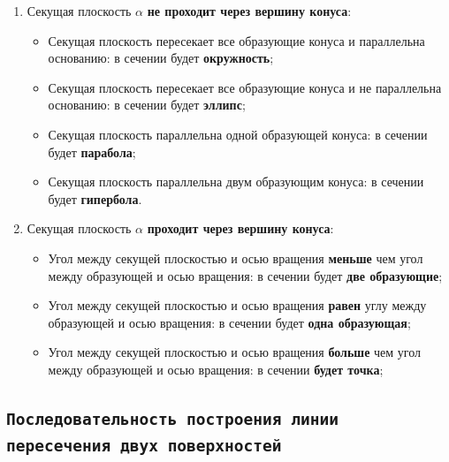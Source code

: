 \begin{myquote}
\end{myquote}

\begin{enumerate}
    \item Секущая плоскость $\alpha$ {\bf не проходит через вершину конуса}:
    \begin{itemize}
        \item Секущая плоскость пересекает все образующие конуса и параллельна основанию: в сечении будет {\bf окружность};
        \item Секущая плоскость пересекает все образующие конуса и не параллельна основанию: в сечении будет {\bf эллипс};
        \item Секущая плоскость параллельна одной образующей конуса: в сечении будет {\bf парабола};
        \item Секущая плоскость параллельна двум образующим конуса: в сечении будет {\bf гипербола}.
    \end{itemize}
    \newpage %
    \item Секущая плоскость $\alpha$ {\bf проходит через вершину конуса}:
    \begin{itemize}
        \item Угол между секущей плоскостью и осью вращения {\bf меньше} чем угол между образующей и осью вращения: в сечении будет {\bf две образующие};
        \item Угол между секущей плоскостью и осью вращения {\bf равен} углу между образующей и осью вращения: в сечении будет {\bf одна образующая};
        \item Угол между секущей плоскостью и осью вращения {\bf больше} чем угол между образующей и осью вращения: в сечении {\bf будет точка};

    \end{itemize}
\end{enumerate}



\newpage
\subsection{\texttt{Последовательность построения линии пересечения двух поверхностей}}





